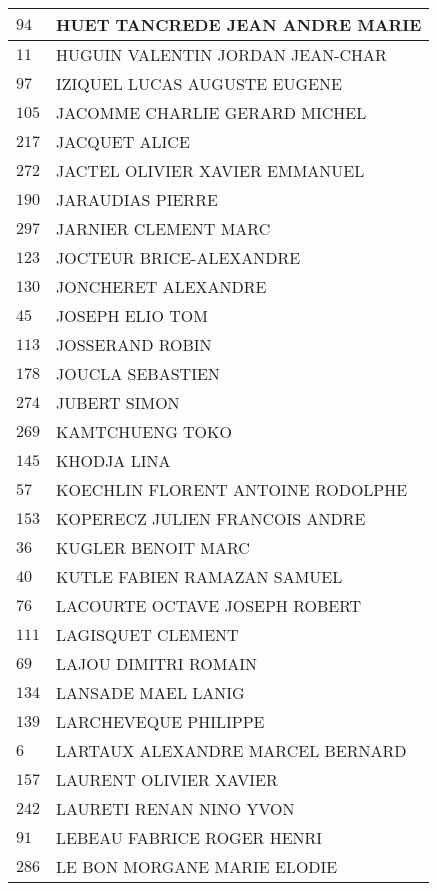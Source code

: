 \begin{xltabular}{\linewidth}{|l|X|}
    \hline
    $94$ & HUET TANCREDE JEAN ANDRE MARIE \\
    \hline
    $11$ & HUGUIN VALENTIN JORDAN JEAN-CHAR \\
    \hline
    $97$ & IZIQUEL LUCAS AUGUSTE EUGENE \\
    \hline
    $105$ & JACOMME CHARLIE GERARD MICHEL \\
    \hline
    $217$ & JACQUET ALICE \\
    \hline
    $272$ & JACTEL OLIVIER XAVIER EMMANUEL \\
    \hline
    $190$ & JARAUDIAS PIERRE \\
    \hline
    $297$ & JARNIER CLEMENT MARC \\
    \hline
    $123$ & JOCTEUR BRICE-ALEXANDRE \\
    \hline
    $130$ & JONCHERET ALEXANDRE \\
    \hline
    $45$ & JOSEPH ELIO TOM \\
    \hline
    $113$ & JOSSERAND ROBIN \\
    \hline
    $178$ & JOUCLA SEBASTIEN \\
    \hline
    $274$ & JUBERT SIMON \\
    \hline
    $269$ & KAMTCHUENG TOKO \\
    \hline
    $145$ & KHODJA LINA \\
    \hline
    $57$ & KOECHLIN FLORENT ANTOINE RODOLPHE \\
    \hline
    $153$ & KOPERECZ JULIEN FRANCOIS ANDRE \\
    \hline
    $36$ & KUGLER BENOIT MARC \\
    \hline
    $40$ & KUTLE FABIEN RAMAZAN SAMUEL \\
    \hline
    $76$ & LACOURTE OCTAVE JOSEPH ROBERT \\
    \hline
    $111$ & LAGISQUET CLEMENT \\
    \hline
    $69$ & LAJOU DIMITRI ROMAIN \\
    \hline
    $134$ & LANSADE MAEL LANIG \\
    \hline
    $139$ & LARCHEVEQUE PHILIPPE \\
    \hline
    $6$ & LARTAUX ALEXANDRE MARCEL BERNARD \\
    \hline
    $157$ & LAURENT OLIVIER XAVIER \\
    \hline
    $242$ & LAURETI RENAN NINO YVON \\
    \hline
    $91$ & LEBEAU FABRICE ROGER HENRI \\
    \hline
    $286$ & LE BON MORGANE MARIE ELODIE \\

\end{xltabular}
